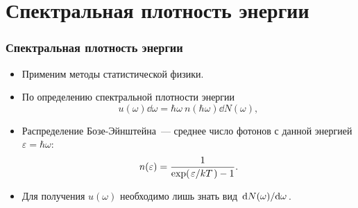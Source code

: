\documentclass[compress]{beamer}
\begin{document}

    \section[СПЭ]{Спектральная плотность энергии}


    \begin{frame}\frametitle{Спектральная плотность энергии}

        \begin{itemize}\justifying
            \item Применим методы статистической физики.

            \item По определению спектральной плотности энергии
            \begin{equation}\label{eq:psd}
                u(\omega) \dd{\omega} = \hbar\omega\ n(\hbar\omega) \dd{N(\omega)} ,
            \end{equation}

            \item Распределение Бозе-Эйнштейна~--- среднее число фотонов с данной энергией $\varepsilon = \hbar\omega$:
            \begin{equation}\label{eq:n_of_eps}
                n(\varepsilon) = \frac{1}{\exp(\flatfrac{\varepsilon}{kT}) - 1} .
            \end{equation}

            \item Для получения $u(\omega)$ необходимо лишь знать вид $\dv*{N(\omega)}{\omega}$.

        \end{itemize}

    \end{frame}

\end{document}
